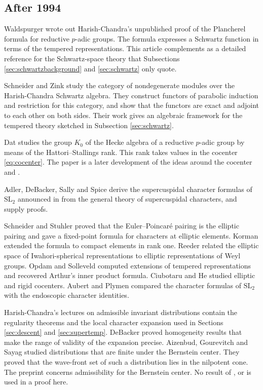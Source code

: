 \documentclass[12pt,letterpaper]{amsart}
\numberwithin{equation}{section}
\theoremstyle{definition}
\theoremstyle{remark}
\begin{document}
\subsection*{After 1994}
Waldspurger \cite{Wa03} wrote out Harish-Chandra's unpublished proof of the Plancherel formula for reductive $p$-adic groups. The formula expresses a Schwartz function in terms of the tempered representations. This article complements \cite{Si79} as a detailed reference for the Schwartz-space theory that Subsections \ref{sec:schwartzbackground} and \ref{sec:schwartz} only quote.

Schneider and Zink \cite{SZ07} study the category of nondegenerate modules over the Harish-Chandra Schwartz algebra. They construct functors of parabolic induction and restriction for this category, and show that the functors are exact and adjoint to each other on both sides. Their work gives an algebraic framework for the tempered theory sketched in Subsection \ref{sec:schwartz}.

Dat \cite{Da00} studies the group $K_0$ of the Hecke algebra of a reductive $p$-adic group by means of the Hattori--Stallings rank. This rank takes values in the cocenter \eqref{eq:cocenter}. The paper is a later development of the ideas around the cocenter and \cite{BDK86,Ka86}.

Adler, DeBacker, Sally and Spice \cite{ADSS11} derive the supercuspidal character formulas of $\mathrm{SL}_2$ announced in \cite{SS68} from the general theory of supercuspidal characters, and supply proofs.

Schneider and Stuhler \cite{SS97} proved that the Euler--Poincar\'e pairing is the elliptic pairing and gave a fixed-point formula for characters at elliptic elements. Korman \cite{Ko04} extended the formula to compact elements in rank one. Reeder \cite{Re01} related the elliptic space of Iwahori-spherical representations to elliptic representations of Weyl groups. Opdam and Solleveld \cite{OS13} computed extensions of tempered representations and recovered Arthur's inner product formula. Ciubotaru and He \cite{CH17,CH21} studied elliptic and rigid cocenters. Aubert and Plymen \cite{AP24} compared the character formulas of $\mathrm{SL}_2$ with the endoscopic character identities.

Harish-Chandra's lectures on admissible invariant distributions \cite{HC99} contain the regularity theorems and the local character expansion used in Sections \ref{sec:descent} and \ref{sec:supertemp}. DeBacker \cite{De02} proved homogeneity results that make the range of validity of the expansion precise. Aizenbud, Gourevitch and Sayag \cite{AGS15} studied distributions that are finite under the Bernstein center. They proved that the wave-front set of such a distribution lies in the nilpotent cone. The preprint \cite{CT26} concerns admissibility for the Bernstein center. No result of \cite{De02}, \cite{AGS15} or \cite{CT26} is used in a proof here.
\end{document}
